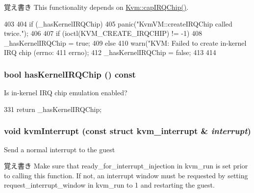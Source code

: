 \begin{DoxyNote}{覚え書き}
This functionality depends on \hyperlink{classKvm_ab3e6d2bb7ea83c6cdc20369bf3a274a6}{Kvm::capIRQChip()}. 
\end{DoxyNote}



\begin{DoxyCode}
403 {
404     if (_hasKernelIRQChip)
405         panic("KvmVM::createIRQChip called twice.\n");
406 
407     if (ioctl(KVM_CREATE_IRQCHIP) != -1) {
408         _hasKernelIRQChip = true;
409     } else {
410         warn("KVM: Failed to create in-kernel IRQ chip (errno: %
411              errno);
412         _hasKernelIRQChip = false;
413     }
414 }
\end{DoxyCode}
\hypertarget{group__KvmInterrupts_ga4e9371a3b5e598c4cde8ebef65be940f}{
\subsubsection[{hasKernelIRQChip}]{\setlength{\rightskip}{0pt plus 5cm}bool hasKernelIRQChip () const}}
\label{group__KvmInterrupts_ga4e9371a3b5e598c4cde8ebef65be940f}
Is in-\/kernel IRQ chip emulation enabled? 


\begin{DoxyCode}
331 { return _hasKernelIRQChip; }
\end{DoxyCode}
\hypertarget{group__KvmInterrupts_ga16b8f95e3f70098952604e6b8a121679}{
\subsubsection[{kvmInterrupt}]{\setlength{\rightskip}{0pt plus 5cm}void kvmInterrupt (const struct kvm\_\-interrupt \& {\em interrupt})}}
\label{group__KvmInterrupts_ga16b8f95e3f70098952604e6b8a121679}
Send a normal interrupt to the guest

\begin{DoxyNote}{覚え書き}
Make sure that ready\_\-for\_\-interrupt\_\-injection in kvm\_\-run is set prior to calling this function. If not, an interrupt window must be requested by setting request\_\-interrupt\_\-window in kvm\_\-run to 1 and restarting the guest.
\end{DoxyNote}

